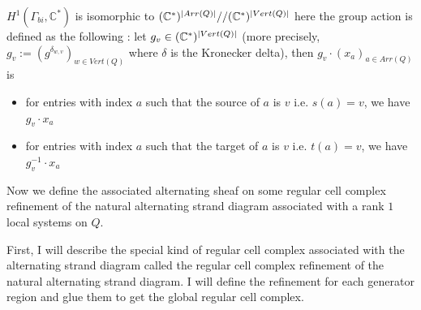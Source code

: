 $H^1(\Gamma_{bi},\mathbb{C}^*)$ is isomorphic to $(\mathbb{C}^*)^{|Arr(Q)|}//(\mathbb{C}^*)^{|Vert(Q)|}$
here the group action is defined as the following : let $g_v \in (\mathbb{C}^*)^{|Vert(Q)|}$
(more precisely, $g_v := (g^{\delta_{w,v}})_{w \in Vert(Q)}$ where $\delta$ is the Kronecker delta),
then $g_v \cdot (x_a)_{a\in Arr(Q)}$ is 

\begin{itemize}
\item for entries with index $a$ such that the source of $a$ is $v$ i.e. $s(a) = v$, we have $g_v \cdot x_a$
\item for entries with index $a$ such that the target of $a$ is $v$ i.e. $t(a) = v$, we have $g_v^{-1} \cdot x_a$
\end{itemize}


Now we define the associated alternating sheaf on some regular cell complex refinement of the natural alternating strand diagram associated with a rank $1$ local systems on $Q$.

First, I will describe the special kind of regular cell complex associated with the alternating strand diagram called the regular cell complex refinement of the natural alternating strand diagram. I will define the refinement for each generator region and glue them to get the global regular cell complex.

